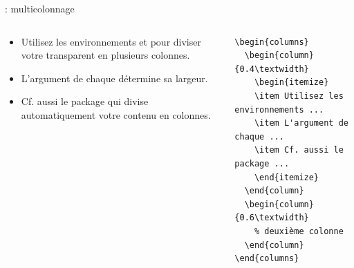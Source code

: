\documentclass{beamer}
\begin{document}
\begin{frame}[fragile]{\insertsection: multicolonnage}
\begin{columns}
\begin{column}{0.4\textwidth}
\begin{itemize}
\item Utilisez les environnements  et  pour diviser votre transparent en plusieurs colonnes.
\item L'argument de chaque  détermine sa largeur.
\item Cf. aussi le package  qui divise automatiquement votre contenu en colonnes.
\end{itemize}
\end{column}
\begin{column}{0.6\textwidth}
\begin{verbatim}
\begin{columns}
  \begin{column}{0.4\textwidth}
    \begin{itemize}
    \item Utilisez les environnements ...
    \item L'argument de chaque ...
    \item Cf. aussi le package ...
    \end{itemize}
  \end{column}
  \begin{column}{0.6\textwidth}
    % deuxième colonne
  \end{column}
\end{columns}
\end{verbatim}
\end{column}
\end{columns}
\end{frame}
\end{document}
